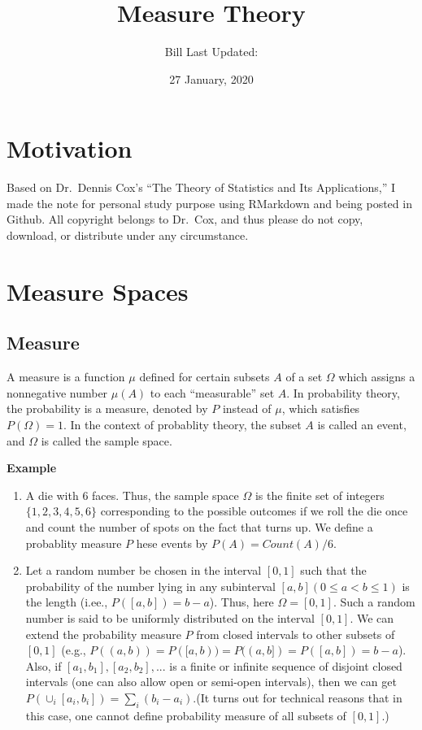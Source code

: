 \documentclass[]{book}
\title{Measure Theory}
\author{Bill Last Updated:}
\date{27 January, 2020}
\begin{document}
\maketitle

{
\setcounter{tocdepth}{1}
\tableofcontents
}
\chapter*{Motivation}\label{my-section}

Based on Dr.~Dennis Cox's ``The Theory of Statistics and Its
Applications,'' I made the note for personal study purpose using
RMarkdown and being posted in Github. All copyright belongs to Dr.~Cox,
and thus please do not copy, download, or distribute under any
circumstance.

\chapter{Measure Spaces}\label{measure-spaces}

\section{Measure}\label{measure}

A measure is a function \(\mu\) defined for certain subsets \(A\) of a
set \(\Omega\) which assigns a nonnegative number \(\mu(A)\) to each
``measurable'' set \(A\). In probability theory, the probability is a
measure, denoted by \(P\) instead of \(\mu\), which satisfies
\(P(\Omega)=1\). In the context of probablity theory, the subset \(A\)
is called an event, and \(\Omega\) is called the sample space.

\textbf{Example}

\begin{enumerate}
\def\labelenumi{(\arabic{enumi})}
\item
  A die with 6 faces. Thus, the sample space \(\Omega\) is the finite
  set of integers \(\{1, 2, 3, 4, 5, 6\}\) corresponding to the possible
  outcomes if we roll the die once and count the number of spots on the
  fact that turns up. We define a probablity measure \(P\) hese events
  by \(P(A)=Count(A)/6\).
\item
  Let a random number be chosen in the interval \([0,1]\) such that the
  probability of the number lying in any subinterval
  \([a,b] (0 \leq a < b \leq 1)\) is the length (i.ee.,
  \(P([a,b])=b-a\)). Thus, here \(\Omega=[0,1]\). Such a random number
  is said to be uniformly distributed on the interval \([0,1]\). We can
  extend the probability measure \(P\) from closed intervals to other
  subsets of \([0,1]\) (e.g.,
  \(P((a,b))=P([a,b))=P((a,b])=P([a,b])=b-a\)). Also, if
  \([a_1,b_1],[a_2,b_2],...\) is a finite or infinite sequence of
  disjoint closed intervals (one can also allow open or semi-open
  intervals), then we can get \(P(\cup_i[a_i,b_i])=\sum_i(b_i-a_i)\).(It
  turns out for technical reasons that in this case, one cannot define
  probability measure of all subsets of \([0,1]\).)
\end{enumerate}
\end{document}
